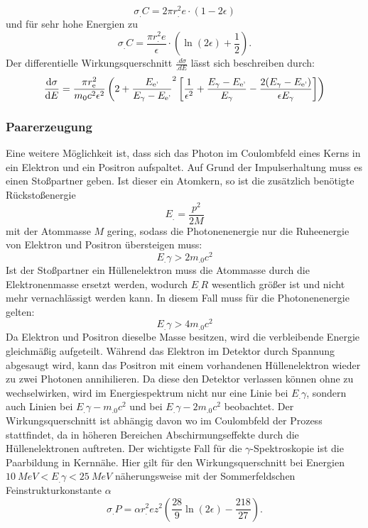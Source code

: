 \begin{equation}
\sigma_.C=2\pi r^2_.e\cdot\left(1-2\epsilon\right)\label{eq:s_C_klein}
\end{equation}
und für sehr hohe Energien zu
\begin{equation}
\sigma_.C=\frac{\pi r^2_.e}{\epsilon}\cdot\left(\ln(2\epsilon)+\frac{1}{2}\right)\text{.}\label{eq:s_C_gross}
\end{equation}
Der differentielle Wirkungsquerschnitt $\frac{.d\sigma}{.dE}$ lässt sich beschreiben durch:
\begin{equation}
\frac{\mathop{}\!\mathrm{d} \sigma}{\mathop{}\!\mathrm{d} E} =  \frac{\pi r_\text{e}^2}{m_0 c^2 \epsilon^2}\left(2+\frac{E_\text{e'}}{E_\gamma - E_\text{e'}}^2 \left[ \frac{1}{\epsilon^2} +\frac{E_\gamma - E_\text{e'}}{E_\gamma} - \frac{2(E_\gamma - E_\text{e'})}{\epsilon E_\gamma} \right]\right) \label{eq:sigmadiff}
\end{equation}

\subsubsection{Paarerzeugung}

Eine weitere Möglichkeit ist, dass sich das Photon im Coulombfeld eines Kerns in ein Elektron und ein Positron aufspaltet. Auf Grund der Impulserhaltung muss es einen Stoßpartner geben. Ist dieser ein Atomkern, so ist die zusätzlich benötigte Rückstoßenergie 
\[
E_.=\frac{p^2}{2M}
\]
mit der Atommasse $M$ gering, sodass die Photonenenergie nur die Ruheenergie von Elektron und Positron übersteigen muss:
\[
E_.{\gamma}>2m_.0c^2
\]
Ist der Stoßpartner ein Hüllenelektron muss die Atommasse durch die Elektronenmasse ersetzt werden, wodurch $E_.R$ wesentlich größer ist und nicht mehr vernachlässigt werden kann.
In diesem Fall muss für die Photonenenergie gelten:
\[
E_.{\gamma}>4m_.0c^2
\]
Da Elektron und Positron dieselbe Masse besitzen, wird die verbleibende Energie gleichmäßig aufgeteilt.
Während das Elektron im Detektor durch Spannung abgesaugt wird, kann das Positron mit einem vorhandenen Hüllenelektron wieder zu zwei Photonen annihilieren.
Da diese den Detektor verlassen können ohne zu wechselwirken, wird im Energiespektrum nicht nur eine Linie bei $E_.{\gamma}$, sondern auch Linien bei $E_.{\gamma}-m_.0c^2$ und bei $E_.{\gamma}-2m_.0c^2$ beobachtet.
Der Wirkungsquerschnitt ist abhängig davon wo im Coulombfeld der Prozess stattfindet, da in höheren Bereichen Abschirmungseffekte durch die Hüllenelektronen auftreten.
Der wichtigste Fall für die $\gamma$-Spektroskopie ist die Paarbildung in Kernnähe.
Hier gilt für den Wirkungsquerschnitt bei Energien $\SI{10}{MeV}<E_.{\gamma}<\SI{25}{MeV}$ näherungsweise mit der Sommerfeldschen Feinstrukturkonstante $\alpha$
\begin{equation}
\sigma_.P=\alpha r^2_.ez^2\left(\frac{28}{9}\ln(2\epsilon)-\frac{218}{27}\right)\text{.}\label{eq:s_P}
\end{equation}


